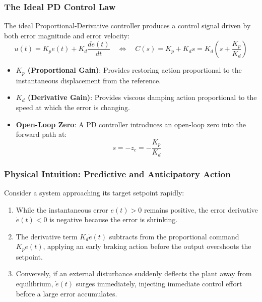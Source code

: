 \documentclass[12pt,onecolumn,twoside ]{article}
\begin{document}
	\subsubsection{The Ideal PD Control Law}
	The ideal Proportional-Derivative controller produces a control signal driven by both error magnitude and error velocity: \[
	u(t) = K_p e(t) + K_d \frac{de(t)}{dt} \quad \Longleftrightarrow \quad C(s) = K_p + K_d s = K_d \left( s + \frac{K_p}{K_d} \right)
	\]
	\begin{itemize}
		\item
		\textbf{$K_p$ (Proportional Gain)}: Provides restoring action proportional to the instantaneous displacement from the reference.
		\item
		\textbf{$K_d$ (Derivative Gain)}: Provides viscous damping action proportional to the speed at which the error is changing.
		\item
		\textbf{Open-Loop Zero}: A PD controller introduces an open-loop zero into the forward path at: \[
		s = -z_c = -\frac{K_p}{K_d}
		\]
	\end{itemize}
	\subsubsection{Physical Intuition: Predictive and Anticipatory Action}
	Consider a system approaching its target setpoint rapidly:
	\begin{enumerate}
		\item
		While the instantaneous error $e(t) > 0$ remains positive, the error derivative $\dot{e}(t) < 0$ is negative because the error is shrinking.
		\item
		The derivative term $K_d \dot{e}(t)$ subtracts from the proportional command $K_p e(t)$, applying an early braking action before the output overshoots the setpoint.
		\item
		Conversely, if an external disturbance suddenly deflects the plant away from equilibrium, $\dot{e}(t)$ surges immediately, injecting immediate control effort before a large error accumulates.
	\end{enumerate}
\end{document}
